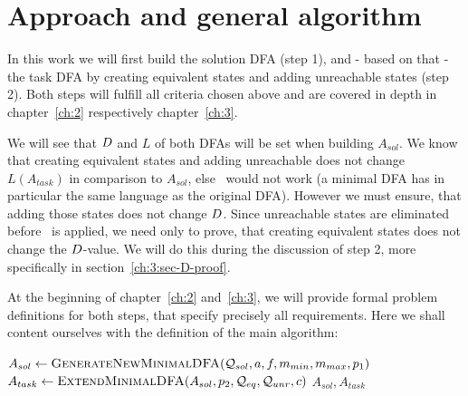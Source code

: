 
\section{Approach and general algorithm}

In this work we will first build the solution DFA (step 1), and - based on that - the task DFA by creating equivalent states and adding unreachable states (step 2). Both steps will fulfill all criteria chosen above and are covered in depth in chapter~\ref{ch:2} respectively chapter~\ref{ch:3}.

We will see that $D$ and $L$ of both DFAs will be set when building $A_{sol}$. We know that creating equivalent states and adding unreachable does not change $L(A_{task})$ in comparison to $A_{sol}$, else \MinAlg\ would not work (a minimal DFA has in particular the same language as the original DFA). However we must ensure, that adding those states does not change $D$. Since unreachable states are eliminated before \CompDist\ is applied, we need only to prove, that creating equivalent states does not change the $D$-value. We will do this during the discussion of step 2, more specifically in section~\ref{ch:3:sec-D-proof}.

At the beginning of chapter~\ref{ch:2} and~\ref{ch:3}, we will provide formal problem definitions for both steps, that specify precisely all requirements. Here we shall content ourselves with the definition of the main algorithm:
\vspace{0.2cm}
\begin{algorithmic}[1]
	\State $A_{sol} \gets \textsc{GenerateNewMinimalDFA}(\mathcal{Q}_{sol}, a, f, m_{min}, m_{max}, p_1)$
	\State $A_{task} \gets \textsc{ExtendMinimalDFA}(A_{sol}, p_2, \mathcal{Q}_{eq},\mathcal{Q}_{unr}, c)$
	\State \Return $A_{sol}, A_{task}$
	\EndFunction
\end{algorithmic}


